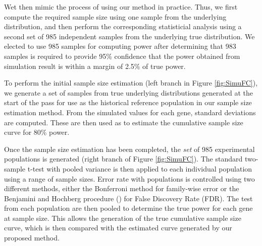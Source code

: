 \documentclass{bioinfo}
\begin{document}
Wet then mimic the process of using our method in practice. Thus, we
first compute the required sample size using one sample from the
underlying distribution, and then perform the corresponding
statisticial analysis using a second set of 985 independent samples
from the underlying true distribution.  We elected to use 985
samples for computing power after determining that 983 samples is
required to provide 95\% confidence that the power obtained from
simulation result is within a margin of 2.5\% of true power.

To perform the initial sample size estimation (left branch in Figure
\ref{fig:SimuFC}), we generate a set of samples from true underlying
distributions generated at the start of the pass for use as the
historical reference population in our sample size estimation
method.  From the simulated values for each gene, standard
deviations are computed. These are then used as to estimate the
cumulative sample size curve for 80\% power.

Once the sample size estimation has been completed, the \emph{set}
of 985 experimental populations is generated (right branch of Figure
\ref{fig:SimuFC}).  The standard two-sample t-test with pooled
variance is then applied to each individual population using a range
of sample sizes. Error rate with populations is controlled using two
different methods, either the Bonferroni method for family-wise
error or the Benjamini and Hochberg procedure
(\citealp{Benjamini95}) for False Discovery Rate (FDR).  The test
from each population are then pooled to determine the true power for
each gene at sample size. This allows the generation of the true
cumulative sample size curve, which is then compared with the
estimated curve generated by our proposed method.
\end{document}
